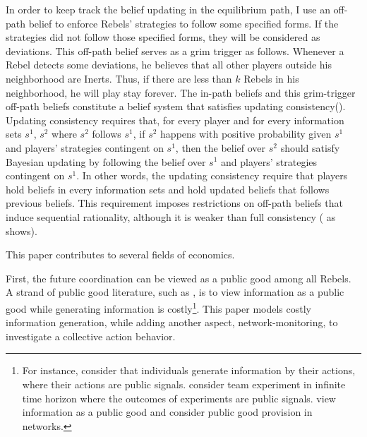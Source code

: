 \documentclass[12pt,letter]{article}
\theoremstyle{definition}
\theoremstyle{remark}
\theoremstyle{claim}
\begin{document}
In order to keep track the belief updating in the equilibrium path, I use an off-path belief to enforce Rebels' strategies to follow some specified forms. If the strategies did not follow those specified forms, they will be considered as deviations. This off-path belief serves as a grim trigger as follows. Whenever a Rebel detects some deviations, he believes that all other players outside his neighborhood are Inerts. Thus, if there are less than $k$ Rebels in his neighborhood, he will play stay forever. The in-path beliefs and this grim-trigger off-path beliefs constitute a belief system that satisfies updating consistency(\citep{Perea2002}). Updating consistency requires that, for every player and for every information sets $s^1$, $s^2$ where $s^2$ follows $s^1$, if $s^2$ happens with positive probability given $s^1$ and players' strategies contingent on $s^1$, then the belief over $s^2$ should satisfy Bayesian updating by following the belief over $s^1$ and players' strategies contingent on $s^1$. In other words, the updating consistency require that players hold beliefs in every information sets and hold updated beliefs that follows previous beliefs. This requirement imposes restrictions on off-path beliefs that induce sequential rationality, although it is weaker than full consistency (\citep{Krep_Wilson1982} as \citep{Perea2002} shows).






This paper contributes to several fields of economics. 

First, the future coordination can be viewed as a public good among all Rebels. A strand of public good literature, such as \citep{Lohmann1994}, is to view information as a public good while generating information is costly\footnote{For instance, \citep{Lohmann1993}\citep{Lohmann1994} consider that individuals generate information by their actions, where their actions are public signals. \citep{Bolto_Harris1999} consider team experiment in infinite time horizon where the outcomes of experiments are public signals. \citep{Bramoulle2007} view information as a public good and consider public good provision in networks.}. This paper models costly information generation, while adding another aspect, network-monitoring, to investigate a collective action behavior.
\end{document}
